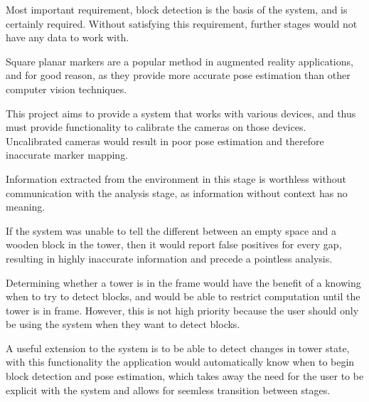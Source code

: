 \begin{enumerate}

Most important requirement, block detection is the basis of the system, and is certainly required. Without satisfying this requirement, further stages would not have any data to work with.

Square planar markers are a popular method in augmented reality applications, and for good reason, as they provide more accurate pose estimation than other computer vision techniques.

This project aims to provide a system that works with various devices, and thus must provide functionality to calibrate the cameras on those devices. Uncalibrated cameras would result in poor pose estimation and therefore inaccurate marker mapping.

Information extracted from the environment in this stage is worthless without communication with the analysis stage, as information without context has no meaning.

If the system was unable to tell the different between an empty space and a wooden block in the tower, then it would report false positives for every gap, resulting in highly inaccurate information and precede a pointless analysis.

Determining whether a tower is in the frame would have the benefit of a knowing when to try to detect blocks, and would be able to restrict computation until the tower is in frame. However, this is not high priority because the user should only be using the system when they want to detect blocks.

A useful extension to the system is to be able to detect changes in tower state, with this functionality the application would automatically know when to begin block detection and pose estimation, which takes away the need for the user to be explicit with the system and allows for seemless transition between stages.


\end{enumerate}
